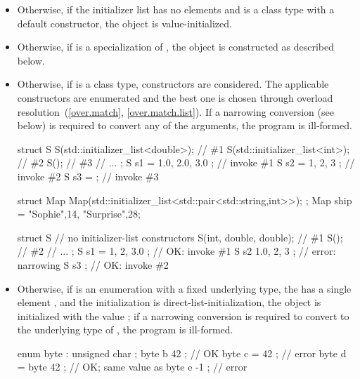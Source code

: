 \begin{itemize}
\item Otherwise, if the initializer list has no elements and  is a class type with a
default constructor, the object is value-initialized.

\item Otherwise, if  is a specialization of ,
the object is constructed as described below.

\item Otherwise, if  is a class type, constructors are considered.
The applicable constructors are enumerated and
the best one is chosen through overload resolution~(\ref{over.match}, \ref{over.match.list}). If a narrowing
conversion (see below) is required to convert any of the arguments, the program is
ill-formed.

\begin{example}
\begin{codeblock}
struct S {
  S(std::initializer_list<double>); // \#1
  S(std::initializer_list<int>);    // \#2
  S();                              // \#3
  // ...
};
S s1 = { 1.0, 2.0, 3.0 };           // invoke \#1
S s2 = { 1, 2, 3 };                 // invoke \#2
S s3 = { };                         // invoke \#3
\end{codeblock}
\end{example}

\begin{example}
\begin{codeblock}
struct Map {
  Map(std::initializer_list<std::pair<std::string,int>>);
};
Map ship = {{"Sophie",14}, {"Surprise",28}};
\end{codeblock}
\end{example}

\begin{example}
\begin{codeblock}
struct S {
  // no initializer-list constructors
  S(int, double, double);           // \#1
  S();                              // \#2
  // ...
};
S s1 = { 1, 2, 3.0 };               // OK: invoke \#1
S s2 { 1.0, 2, 3 };                 // error: narrowing
S s3 { };                           // OK: invoke \#2
\end{codeblock}
\end{example}

\item Otherwise, if  is an enumeration
with a fixed underlying type,
the  has a single element , and
the initialization is direct-list-initialization,
the object is initialized with the value ;
if a narrowing conversion is required to convert 
to the underlying type of , the program is ill-formed.
\begin{example}
\begin{codeblock}
enum byte : unsigned char { };
byte b { 42 };                      // OK
byte c = { 42 };                    // error
byte d = byte{ 42 };                // OK; same value as 
byte e { -1 };                      // error


\end{codeblock}
\end{example}
\end{itemize}
